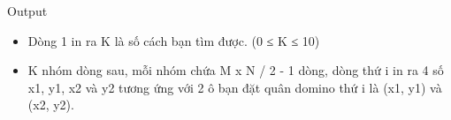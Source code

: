 Output
\begin{itemize}
	\item     Dòng 1 in ra K là số cách bạn tìm được. (0 ≤ K ≤ 10)   
	\item     K nhóm dòng sau, mỗi nhóm chứa M x N / 2 - 1 dòng, dòng thứ i in ra 4 số x1, y1, x2 và y2 tương ứng với 2 ô bạn đặt quân domino thứ i là (x1, y1) và (x2, y2).   
\end{itemize}